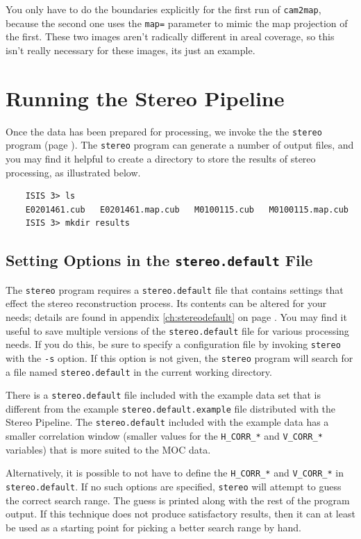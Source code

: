 You only have to do the boundaries explicitly for the first run of
\texttt{cam2map}, because the second one uses the \texttt{map=}
parameter to mimic the map projection of the first.  These two
images aren't radically different in areal coverage, so this isn't
really necessary for these images, its just an example.

\section{Running the Stereo Pipeline}

Once the data has been prepared for processing, we invoke the the
\texttt{stereo} program (page \pageref{stereo}).  The \texttt{stereo}
program can generate a number of output files, and you may find it
helpful to create a directory to store the results of stereo
processing, as illustrated below.

\begin{verbatim}
    ISIS 3> ls
    E0201461.cub   E0201461.map.cub   M0100115.cub   M0100115.map.cub
    ISIS 3> mkdir results
\end{verbatim}

\subsection{Setting Options in the \texttt{stereo.default} File}

The \texttt{stereo} program requires a \texttt{stereo.default} file
that contains settings that effect the stereo reconstruction process.
Its contents can be altered for your needs; details are found in
appendix \ref{ch:stereodefault} on page \pageref{ch:stereodefault}.
You may find it useful to save multiple versions of the
\texttt{stereo.default} file for various processing needs. If you do
this, be sure to specify a configuration file by invoking
\texttt{stereo} with the \texttt{-s} option.  If this option is not
given, the \texttt{stereo} program will search for a file named
\texttt{stereo.default} in the current working directory.

There is a \texttt{stereo.default} file included with the example data
set that is different from the example \texttt{stereo.default.example}
file distributed with the Stereo Pipeline.  The
\texttt{stereo.default} included with the example data has a smaller
correlation window (smaller values for the \texttt{H\_CORR\_*} and
\texttt{V\_CORR\_*} variables) that is more suited to the MOC data.

Alternatively, it is possible to not have to define the
\texttt{H\_CORR\_*} and \texttt{V\_CORR\_*} in
\texttt{stereo.default}. If no such options are specified,
\texttt{stereo} will attempt to guess the correct search range. The
guess is printed along with the rest of the program output.  If this
technique does not produce satisfactory results, then it can at least
be used as a starting point for picking a better search range by hand.

